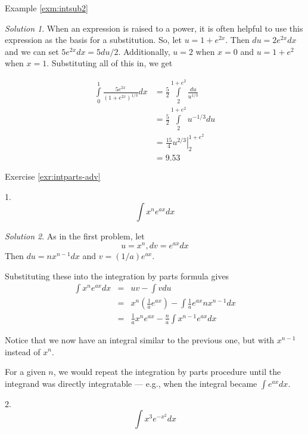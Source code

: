\documentclass[
]{book}
\theoremstyle{definition}
\theoremstyle{definition}
\theoremstyle{definition}
\theoremstyle{remark}
\newtheorem*{solution}{Solution}
\begin{document}
Example \ref{exm:intsub2}
\begin{solution}
{}When an expression is raised to a power, it is often helpful to use this expression as the basis for a substitution. So, let \(u=1+e^{2x}\). Then \(du=2e^{2x}dx\) and we can set \(5e^{2x}dx=5du/2\). Additionally, \(u=2\) when \(x=0\) and \(u=1+e^2\) when \(x=1\). Substituting all of this in, we get

\begin{align*}
\int\limits_0^1 \frac{5e^{2x}}{(1+e^{2x})^{1/3}}dx
            &= \frac{5}{2}\int\limits_2^{1+e^2}\frac{du}{u^{1/3}}\\
            &= \frac{5}{2}\int\limits_2^{1+e^2} u^{-1/3}du\\
            &= \left. \frac{15}{4} u^{2/3} \right|_2^{1+e^2}\\
            &= 9.53
\end{align*}
\end{solution}

Exercise \ref{exr:intparts-adv}

1. \[\int x^n e^{ax} dx\]
\begin{solution}
{}
As in the first problem, let
\[u=x^n, dv=e^{ax}dx\]
Then \(du=n x^{n-1}dx\) and \(v=(1/a)e^{ax}\).

Substituting these into the integration by parts formula gives
\begin{eqnarray}
            \int x^n e^{ax} dx &=& u v - \int v du\nonumber\\
            &=&x^n\left( \frac{1}{a}e^{ax}\right) - \int\frac{1}{a}e^{ax} n x^{n-1} dx\nonumber\\
            &=&\frac{1}{a}x^n e^{ax} - \frac{n}{a}\int x^{n-1}e^{ax}dx\nonumber
\end{eqnarray}

Notice that we now have an integral similar to the previous one, but with \(x^{n-1}\) instead of \(x^n\).

For a given \(n\), we would repeat the integration by parts procedure until the integrand was directly integratable --- e.g., when the integral became \(\int e^{ax}dx\).
\end{solution}

2. \[\int x^3 e^{-x^2} dx\]
\end{document}
